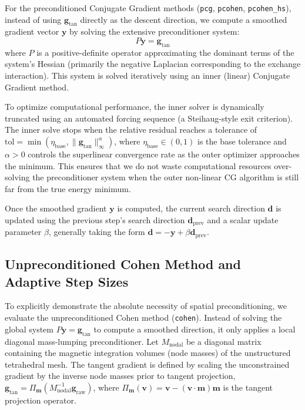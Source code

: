 \documentclass[11pt,a4paper]{article}
\begin{document}
For the preconditioned Conjugate Gradient methods (\texttt{pcg}, \texttt{pcohen}, \texttt{pcohen\_hs}), instead of using $\mathbf{g}_{\text{tan}}$ directly as the descent direction, we compute a smoothed gradient vector $\mathbf{y}$ by solving the extensive preconditioner system:
\begin{equation}
    P \mathbf{y} = \mathbf{g}_{\text{tan}}
\end{equation}
where $P$ is a positive-definite operator approximating the dominant terms of the system's Hessian (primarily the negative Laplacian corresponding to the exchange interaction). This system is solved iteratively using an inner (linear) Conjugate Gradient method. 

To optimize computational performance, the inner solver is dynamically truncated using an automated forcing sequence (a Steihaug-style exit criterion). The inner solve stops when the relative residual reaches a tolerance of $\text{tol} = \min(\eta_{\text{base}}, \|\mathbf{g}_{\text{tan}}\|_\infty^\alpha)$, where $\eta_{\text{base}} \in (0, 1)$ is the base tolerance and $\alpha > 0$ controls the superlinear convergence rate as the outer optimizer approaches the minimum. This ensures that we do not waste computational resources over-solving the preconditioner system when the outer non-linear CG algorithm is still far from the true energy minimum.

Once the smoothed gradient $\mathbf{y}$ is computed, the current search direction $\mathbf{d}$ is updated using the previous step's search direction $\mathbf{d}_{\text{prev}}$ and a scalar update parameter $\beta$, generally taking the form $\mathbf{d} = -\mathbf{y} + \beta \mathbf{d}_{\text{prev}}$.

\subsection{Unpreconditioned Cohen Method and Adaptive Step Sizes}
To explicitly demonstrate the absolute necessity of spatial preconditioning, we evaluate the unpreconditioned Cohen method (\texttt{cohen}). Instead of solving the global system $P \mathbf{y} = \mathbf{g}_{\text{tan}}$ to compute a smoothed direction, it only applies a local diagonal mass-lumping preconditioner. Let $M_{\text{nodal}}$ be a diagonal matrix containing the magnetic integration volumes (node masses) of the unstructured tetrahedral mesh. The tangent gradient is defined by scaling the unconstrained gradient by the inverse node masses prior to tangent projection, $\mathbf{g}_{\text{tan}} = \Pi_{\mathbf{m}}(M_{\text{nodal}}^{-1} \mathbf{g}_{\text{raw}})$, where $\Pi_{\mathbf{m}}(\mathbf{v}) = \mathbf{v} - (\mathbf{v} \cdot \mathbf{m})\mathbf{m}$ is the tangent projection operator.
\end{document}
